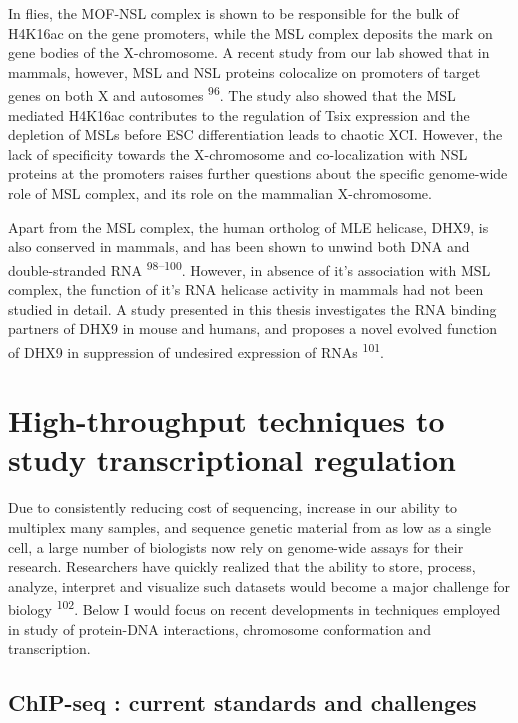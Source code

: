 \documentclass[11pt,twoside]{MPIthesis}
\theoremstyle{definition}
\theoremstyle{definition}
\theoremstyle{definition}
\theoremstyle{remark}
\begin{document}
In flies, the MOF-NSL complex is shown to be responsible for the bulk of
H4K16ac on the gene promoters, while the MSL complex deposits the mark
on gene bodies of the X-chromosome. A recent study from our lab showed
that in mammals, however, MSL and NSL proteins colocalize on promoters
of target genes on both X and autosomes \textsuperscript{96}. The study
also showed that the MSL mediated H4K16ac contributes to the regulation
of Tsix expression and the depletion of MSLs before ESC differentiation
leads to chaotic XCI. However, the lack of specificity towards the
X-chromosome and co-localization with NSL proteins at the promoters
raises further questions about the specific genome-wide role of MSL
complex, and its role on the mammalian X-chromosome.

Apart from the MSL complex, the human ortholog of MLE helicase, DHX9, is
also conserved in mammals, and has been shown to unwind both DNA and
double-stranded RNA \textsuperscript{98--100}. However, in absence of
it's association with MSL complex, the function of it's RNA helicase
activity in mammals had not been studied in detail. A study presented in
this thesis investigates the RNA binding partners of DHX9 in mouse and
humans, and proposes a novel evolved function of DHX9 in suppression of
undesired expression of RNAs \textsuperscript{101}.

\section{High-throughput techniques to study transcriptional
regulation}\label{high-throughput-techniques-to-study-transcriptional-regulation}

Due to consistently reducing cost of sequencing, increase in our ability
to multiplex many samples, and sequence genetic material from as low as
a single cell, a large number of biologists now rely on genome-wide
assays for their research. Researchers have quickly realized that the
ability to store, process, analyze, interpret and visualize such
datasets would become a major challenge for biology
\textsuperscript{102}. Below I would focus on recent developments in
techniques employed in study of protein-DNA interactions, chromosome
conformation and transcription.

\subsection{ChIP-seq : current standards and
challenges}\label{chip-seq-current-standards-and-challenges}
\end{document}
